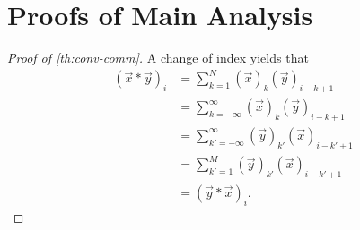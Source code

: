 \documentclass[a4paper, openany, oneside]{memoir}
\begin{document}
\section{Proofs of Main Analysis}
\begin{proof}[Proof of \cref{th:conv-comm}]
    A change of index yields that
    \begin{align*}
        (\vec{x} \ast \vec{y})_i &= \sum_{k=1}^{N} (\vec{x})_k (\vec{y})_{i-k+1} \\
        &= \sum_{k=-\infty}^{\infty} (\vec{x})_k (\vec{y})_{i-k+1} \\
        &= \sum_{k'=-\infty}^{\infty} (\vec{y})_{k'} (\vec{x})_{i-k'+1} \\
        &= \sum_{k'=1}^{M} (\vec{y})_{k'} (\vec{x})_{i-k'+1} \\
        &= (\vec{y} \ast \vec{x})_i.
    \end{align*}
\end{proof}
\end{document}
